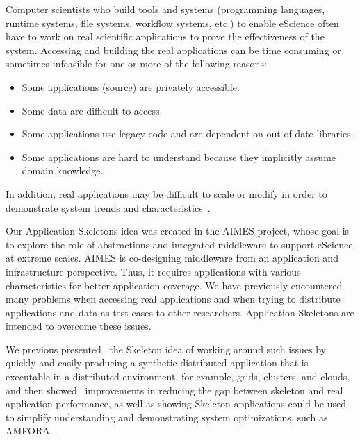 \documentclass[preprint,12pt]{elsarticle}
\newcommand{\zhaonote}[1]{{\textcolor{darkgreen}{ ***Zhao:  #1 }}}
\newcommand{\zhaonote}[1]{}
\begin{document}
Computer scientists who build tools and systems (programming languages, runtime systems, file systems, workflow systems, etc.) 
to enable eScience often have to work on real scientific applications to prove the effectiveness of 
the system. Accessing and building the real applications can be time consuming or sometimes infeasible for one
or more of the following reasons:
\begin{itemize}
\item {} Some applications (source) are privately accessible.
\item {} Some data are difficult to access.
\item {} Some applications use legacy code and are dependent on out-of-date libraries.
\item {} Some applications are hard to understand because they implicitly assume domain knowledge.
\end{itemize}
In addition, real applications may be difficult to scale or modify in order to demonstrate
system trends and characteristics~\cite{DPA-paper}.

Our Application Skeletons idea was created in the AIMES project, whose goal is to explore the role of abstractions
and integrated middleware to support eScience at extreme scales. AIMES is co-designing middleware from an application and infrastructure
perspective. Thus, it requires applications with various characteristics for better application coverage. We have previously encountered many problems
when accessing real applications and when trying to distribute applications and data as test cases to other researchers. Application Skeletons are intended to overcome these issues.

We previous presented~\cite{Skeleton2013} the Skeleton idea of working around such issues by quickly
and easily producing a synthetic distributed application that is executable in a distributed environment, for example, grids, clusters, and clouds, and then showed~\cite{Skeleton2014} improvements in reducing the gap between skeleton and real application performance, as well
as showing Skeleton applications could be used to simplify understanding and demonstrating system optimizations, such as AMFORA~\cite{AMFS2013}.
\end{document}

